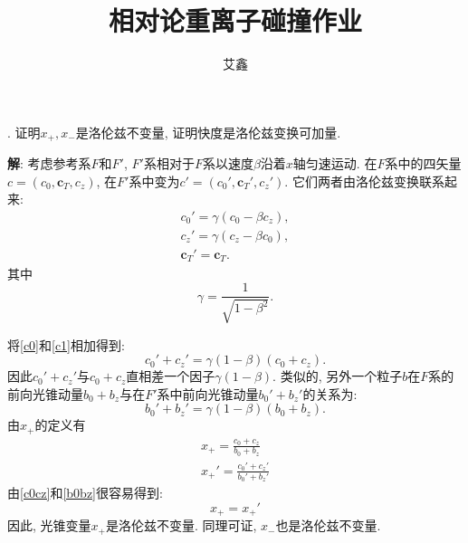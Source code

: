 \documentclass{ctexart}
\title{相对论重离子碰撞作业}
\author{艾鑫}
\newcounter{mycnt}
\newenvironment{problem}{\noindent \stepcounter{mycnt}\themycnt.}{

}
\newenvironment{answer}{\textbf{解}:}{
\vspace{0.5cm}
}
\begin{document}
\maketitle

\begin{problem}
  证明$x_+, x_-$是洛伦兹不变量, 证明快度是洛伦兹变换可加量.
\end{problem}

\begin{answer}
  考虑参考系$F$和$F'$, $F'$系相对于$F$系以速度$\beta$沿着$x$轴匀速运动. 在$F$系中的四矢量$c = (c_0, \bm{c}_T, c_z)$, 在$F'$系中变为$c' = (c_0', \bm{c}_T', c_z')$. 它们两者由洛伦兹变换联系起来:
  \begin{gather}\label{c0}
    c_0' = \gamma (c_0 - \beta c_z), \\ \label{c1}
    c_z' = \gamma (c_z - \beta c_0), \\
    \bm{c}_T' = \bm{c}_T.
  \end{gather}
其中
\begin{equation}
  \gamma = \frac{1}{\sqrt{1-\beta^2}}.
\end{equation}

将\eqref{c0}和\eqref{c1}相加得到:
\begin{equation}
  c_0' + c_z' = \gamma (1 - \beta) (c_0 + c_z). \label{c0cz}
\end{equation}
因此$c_0' + c_z'$与$c_0 + c_z$直相差一个因子$\gamma (1 - \beta)$. 类似的, 另外一个粒子$b$在$F$系的前向光锥动量$b_0 + b_z$与在$F'$系中前向光锥动量$b_0' + b_z'$的关系为:
\begin{equation}
  b_0' + b_z' = \gamma (1 - \beta) (b_0 + b_z). \label{b0bz}
\end{equation}
由$x_+$的定义有
\begin{gather}
  x_+ = \frac{c_0 + c_z}{b_0 + b_z} \\
  x_+' = \frac{c_0' + c_z'}{b_0' + b_z'}
\end{gather}
由\eqref{c0cz}和\eqref{b0bz}很容易得到:
\begin{equation}
  x_+ = x_+'
\end{equation}
因此, 光锥变量$x_+$是洛伦兹不变量. 同理可证, $x_-$也是洛伦兹不变量.


\end{answer}
\end{document}
